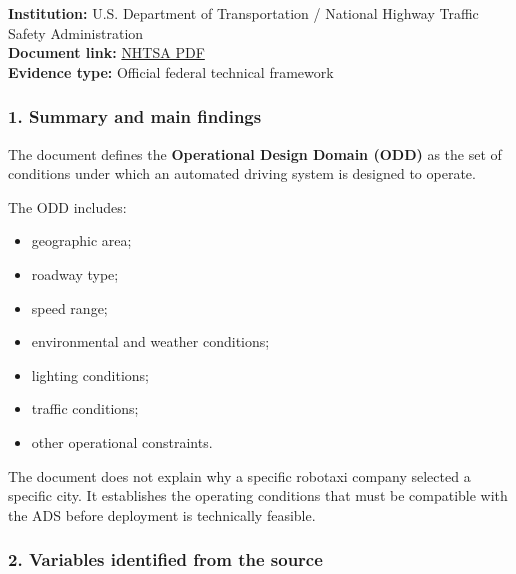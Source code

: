 \documentclass[10pt,a4paper]{article}
\providecommand{\tightlist}{\setlength{\itemsep}{0pt}\setlength{\parskip}{0pt}}
\begin{document}
\textbf{Institution:} U.S. Department of Transportation / National Highway Traffic Safety Administration\\
\textbf{Document link:} \href{https://www.nhtsa.gov/sites/nhtsa.gov/files/documents/13882-automateddrivingsystems_092618_v1a_tag.pdf}{NHTSA PDF}\\
\textbf{Evidence type:} Official federal technical framework

\hypertarget{summary-and-main-findings}{%
\subsubsection{1. Summary and main findings}\label{summary-and-main-findings}}

The document defines the \textbf{Operational Design Domain (ODD)} as the set of conditions under which an automated driving system is designed to operate.

The ODD includes:

\begin{itemize}
\tightlist
\item
  geographic area;
\item
  roadway type;
\item
  speed range;
\item
  environmental and weather conditions;
\item
  lighting conditions;
\item
  traffic conditions;
\item
  other operational constraints.
\end{itemize}

The document does not explain why a specific robotaxi company selected a specific city. It establishes the operating conditions that must be compatible with the ADS before deployment is technically feasible.

\hypertarget{variables-identified-from-the-source}{%
\subsubsection{2. Variables identified from the source}\label{variables-identified-from-the-source}}
\end{document}
